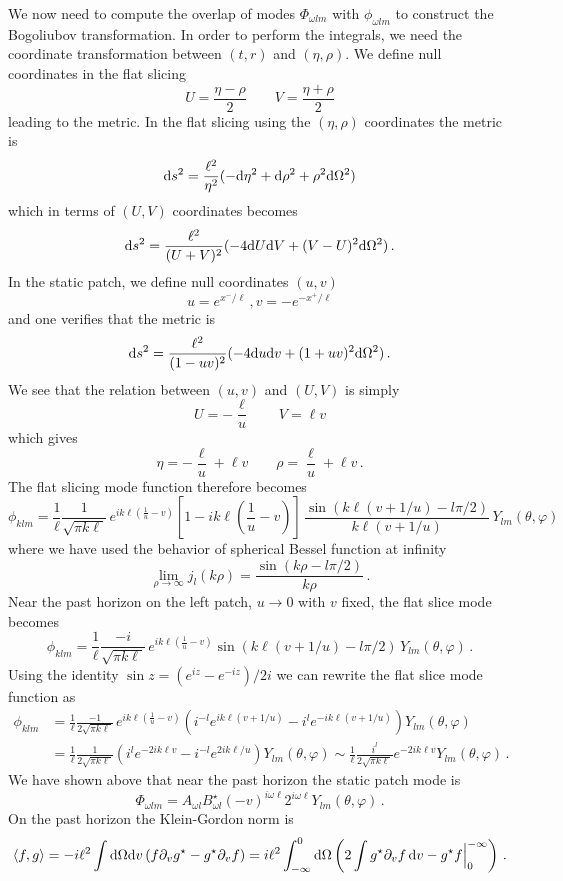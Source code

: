 \documentclass{brownthesis}
\def\dd{{\rm d}}
\begin{document}
We now need to compute the overlap of modes $\Phi_{\omega lm}$ with
$\phi_{\omega lm}$ to construct the Bogoliubov transformation. In
order to perform the integrals, we need the coordinate transformation
between $(t,r)$ and $(\eta,\rho)$. We define null coordinates in
the flat slicing
\[
U=\frac{\eta-\rho}{2}\qquad V=\frac{\eta+\rho}{2}
\]
leading to the metric. In the flat slicing using the $(\eta,\rho)$
coordinates the metric is
\[
\dd s^{2}=\frac{\ell^{2}}{\eta^{2}}(-\dd\eta^{2}+\dd\rho^{2}+\rho^{2}\dd\Omega^{2})
\]
which in terms of $(U,V)$ coordinates becomes
\[
\dd s^{2}=\frac{\ell^{2}}{(U+V)^{2}}(-4\dd U\dd V+(V-U)^{2}\dd\Omega^{2})\,.
\]
In the static patch, we define null coordinates $(u,v)$
\[
u=e^{x^{-}/\ell}\,,v=-e^{-x^{+}/\ell}
\]
and one verifies that the metric is
\[
\dd s^{2}=\frac{\ell^{2}}{(1-uv)^{2}}(-4\dd u\dd v+(1+uv)^{2}\dd\Omega^{2})\,.
\]
We see that the relation between $(u,v)$ and $(U,V)$ is simply
\[
U=-\frac{\ell}{u}\qquad V=\ell v
\]
which gives
\[
\eta=-\frac{\ell}{u}+\ell v\qquad\rho=\frac{\ell}{u}+\ell v\,.
\]
The flat slicing mode function therefore becomes
\[
\phi_{klm}=\frac{1}{\ell}\frac{1}{\sqrt{\pi k\ell}}\,e^{ik\ell(\frac{1}{u}-v)}\left[1-ik\ell\left(\frac{1}{u}-v\right)\right]\,\frac{\sin(k\ell(v+1/u)-l\pi/2)}{k\ell(v+1/u)}\,Y_{lm}(\theta,\varphi)
\]
where we have used the behavior of spherical Bessel function at infinity
\[
\lim_{\rho\to\infty}j_{l}(k\rho)=\frac{\sin(k\rho-l\pi/2)}{k\rho}\,.
\]
Near the past horizon on the left patch, $u\to0$ with $v$ fixed,
the flat slice mode becomes
\[
\phi_{klm}=\frac{1}{\ell}\frac{-i}{\sqrt{\pi k\ell}}\,e^{ik\ell(\frac{1}{u}-v)}\sin(k\ell(v+1/u)-l\pi/2)\,Y_{lm}(\theta,\varphi)\,.
\]
Using the identity $\sin z=(e^{iz}-e^{-iz})/2i$ we can rewrite the
flat slice mode function as
\begin{align*}
\phi_{klm} & =\frac{1}{\ell}\frac{-1}{2\sqrt{\pi k\ell}}\,e^{ik\ell(\frac{1}{u}-v)}(i^{-l}e^{ik\ell(v+1/u)}-i^{l}e^{-ik\ell(v+1/u)})Y_{lm}(\theta,\varphi)\\
 & =\frac{1}{\ell}\frac{1}{2\sqrt{\pi k\ell}}(i^{l}e^{-2ik\ell v}-i^{-l}e^{2ik\ell/u})Y_{lm}(\theta,\varphi)\sim\frac{1}{\ell}\frac{i^{l}}{2\sqrt{\pi k\ell}}e^{-2ik\ell v}Y_{lm}(\theta,\varphi)\,.
\end{align*}
We have shown above that near the past horizon the static patch mode
is
\[
\Phi_{\omega lm}=A_{\omega l}B_{\omega l}^{\star}(-v)^{i\omega\ell}2^{i\omega\ell}Y_{lm}(\theta,\varphi)\,.
\]
On the past horizon the Klein-Gordon norm is
\[
\left\langle f,g\right\rangle =-i\ell^{2}\int\dd\Omega\dd v\,(f\partial_{v}g^{\star}-g^{\star}\partial_{v}f)=i\ell^{2}\int_{-\infty}^{0}\dd\Omega\left(2\int g^{\star}\partial_{v}f\,\dd v-g^{\star}f\Big|_{0}^{-\infty}\right)\,.
\]
\end{document}
